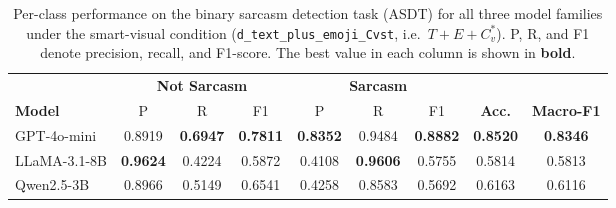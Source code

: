 \begin{table}[t]
\centering
\caption{Per-class performance on the binary sarcasm detection task (ASDT) for all three model families under the smart-visual condition (\texttt{d\_text\_plus\_emoji\_Cvst}, i.e.\ $T{+}E{+}C^{*}_{v}$). P, R, and F1 denote precision, recall, and F1-score. The best value in each column is shown in \textbf{bold}.}
\label{tab:sarcasm-allmodels}
\small
\setlength{\tabcolsep}{6pt}
\renewcommand{\arraystretch}{1.2}
\begin{tabular}{l ccc ccc cc}
\toprule
& \multicolumn{3}{c}{\textbf{Not Sarcasm}} & \multicolumn{3}{c}{\textbf{Sarcasm}} & & \\
\cmidrule(lr){2-4}\cmidrule(lr){5-7}
\textbf{Model} & P & R & F1 & P & R & F1 & \textbf{Acc.} & \textbf{Macro-F1} \\
\midrule
GPT-4o-mini & 0.8919 & \textbf{0.6947} & \textbf{0.7811} & \textbf{0.8352} & 0.9484 & \textbf{0.8882} & \textbf{0.8520} & \textbf{0.8346} \\
LLaMA-3.1-8B & \textbf{0.9624} & 0.4224 & 0.5872 & 0.4108 & \textbf{0.9606} & 0.5755 & 0.5814 & 0.5813 \\
Qwen2.5-3B & 0.8966 & 0.5149 & 0.6541 & 0.4258 & 0.8583 & 0.5692 & 0.6163 & 0.6116 \\
\bottomrule
\end{tabular}
\end{table}

\begin{table}[t]
\centering
\caption{Per-class performance on the 3-class sentiment classification task (MSAD) for all three model families under the smart-visual condition (\texttt{d\_text\_plus\_emoji\_Cvst}, i.e.\ $T{+}E{+}C^{*}_{v}$). P, R, and F1 denote precision, recall, and F1-score. The best value in each column is shown in \textbf{bold}.}
\label{tab:sentiment-allmodels}
\small
\setlength{\tabcolsep}{5pt}
\renewcommand{\arraystretch}{1.2}
\end{table}

